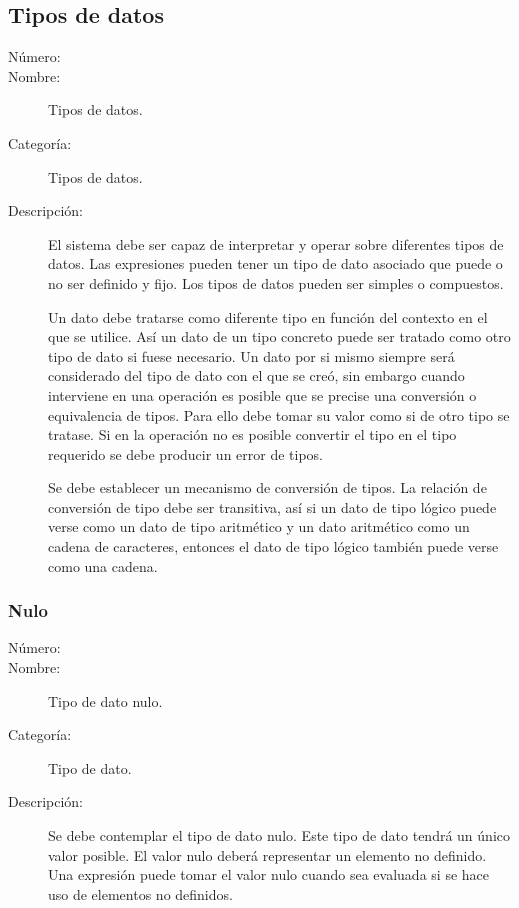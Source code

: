 \subsection{Tipos de datos}

\begin{framed}
	\begin{description}
		\item [Número:] \cn
		\item [Nombre:] Tipos de datos.
		\item [Categoría:] Tipos de datos.
		\item [Descripción:] El sistema debe ser capaz de interpretar y operar sobre diferentes tipos de datos. Las expresiones
		pueden tener un tipo de dato asociado que puede o no ser definido y fijo. Los tipos de datos pueden ser simples o compuestos.
		
		Un dato debe tratarse como diferente tipo en función del contexto en el que se utilice. Así un dato de un tipo concreto puede ser tratado como
		otro tipo de dato si fuese necesario. Un dato por si mismo siempre será considerado del tipo de dato con el que se creó, sin embargo
		cuando interviene en una operación es posible que se precise una conversión o equivalencia de tipos. Para ello debe tomar su valor como si de otro
		tipo se tratase. Si en la operación no es posible convertir el tipo en el tipo requerido se debe producir un error de tipos.
      
		Se debe establecer un mecanismo de conversión de tipos. La relación de conversión de tipo debe ser transitiva, así
		si un dato de tipo lógico puede verse como un dato de tipo aritmético y un dato aritmético como un cadena de caracteres, entonces el
		dato de tipo lógico también puede verse como una cadena.
   \end {description}
\end{framed}

\subsubsection{Nulo}
\begin{framed}
	\begin{description}
		\item [Número:] \cn
		\item [Nombre:] Tipo de dato nulo.
		\item [Categoría:] Tipo de dato.
		\item [Descripción:] Se debe contemplar el tipo de dato nulo. Este tipo de dato tendrá un único valor 
      posible. El valor nulo deberá representar un elemento no definido. Una expresión puede tomar el
      valor nulo cuando sea evaluada si se hace uso de elementos no definidos.
	\end {description}
\end{framed}

